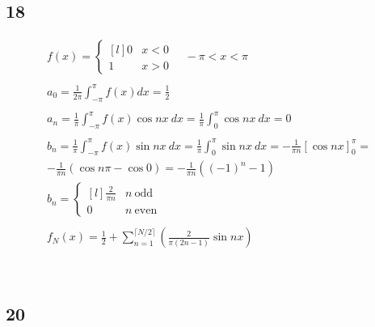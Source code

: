 \subsection*{18}


\begin{gather*}
	f(x) = \left\{\begin{matrix*}[l]
		0 &	x < 0 \\
		1 & x > 0
	\end{matrix*}\right. \quad
	-\pi < x < \pi
	\\
	\\
	a_0 = \frac{1}{2 \pi} \int_{-\pi}^\pi{f(x) dx} = \frac{1}{2}
	\\
	\\
	a_n = \frac{1}{\pi} \int_{-\pi}^\pi{f(x) \cos{n x}\ d x} = \frac{1}{\pi} \int_0^\pi{\cos{n x}\ d x} = 0
	\\
	\\
	b_n = \frac{1}{\pi} \int_{-\pi}^\pi{f(x) \sin{n x}\ d x} = \frac{1}{\pi} \int_0^\pi{\sin{n x}\ d x} =
	- \frac{1}{\pi n} \left[
		\cos{n x}
	\right]_0^\pi =
	\\
	- \frac{1}{\pi n} \left(
		\cos{n \pi} - \cos{0}
	\right) =
	- \frac{1}{\pi n} \left(
		(-1)^n - 1
	\right) \\
	b_n = \left\{\begin{matrix*}[l]
		\frac{2}{\pi n}	& n\ \text{odd} \\
		0					& n\ \text{even}
	\end{matrix*}\right.
	\\
	\\
	f_N(x) = \frac{1}{2} + \sum_{n = 1}^{\lceil N / 2 \rceil}{\left(
		\frac{2}{\pi (2 n - 1)} \sin{n x}
	\right)}
\end{gather*}

\bigskip

\bigskip
\\


\newpage

\subsection*{20}


